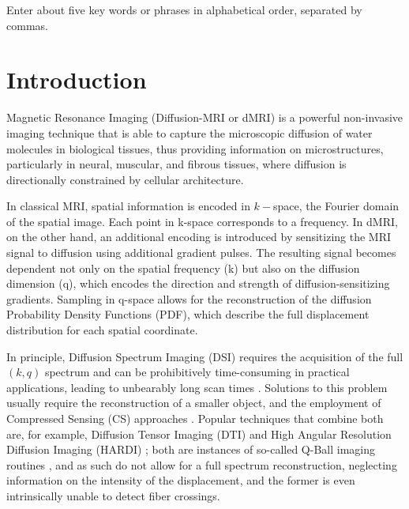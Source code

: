 \documentclass[journal,twoside,web]{ieeecolor}
\begin{document}
\begin{IEEEkeywords}
Enter about five key words or phrases in alphabetical order, separated by commas.
\end{IEEEkeywords}

\section{Introduction}
\label{sec:introduction}
 Magnetic Resonance Imaging (Diffusion-MRI or dMRI) is a powerful non-invasive imaging technique that is able to capture the microscopic diffusion of water molecules in biological tissues, thus providing information on microstructures, particularly in neural, muscular, and fibrous tissues, where diffusion is directionally constrained by cellular architecture.

In classical MRI, spatial information is encoded in $k-$space, the Fourier domain of the spatial image. Each point in k-space corresponds to a frequency. In dMRI, on the other hand, an additional encoding is introduced by sensitizing the MRI signal to diffusion using additional gradient pulses. The resulting signal becomes dependent not only on the spatial frequency (k) but also on the diffusion dimension (q), which encodes the direction and strength of diffusion-sensitizing gradients. Sampling in q-space allows for the reconstruction of the diffusion Probability Density Functions (PDF), which describe the full displacement distribution for each spatial coordinate.

In principle, Diffusion Spectrum Imaging (DSI) requires the acquisition of the full $(k,q)$ spectrum and can be prohibitively time-consuming in practical applications, leading to unbearably long scan times \cite{wedeen2005mapping,wedeen2008diffusion}. Solutions to this problem usually require the reconstruction of a smaller object, and the employment of Compressed Sensing (CS) approaches \cite{menzel2011accelerated,bilgic2012accelerated}. Popular techniques that combine both are, for example, Diffusion Tensor Imaging (DTI) \cite{basser1994estimation} and High Angular Resolution Diffusion Imaging (HARDI) \cite{tuch2002high,frank2002characterization,alexander2002detection}; both are instances of so-called Q-Ball imaging routines \cite{tuch2004q,descoteaux2007regularized}, and as such do not allow for a full spectrum reconstruction, neglecting information on the intensity of the displacement, and the former is even intrinsically unable to detect fiber crossings.
\end{document}
